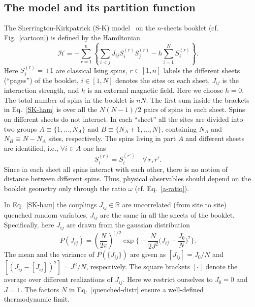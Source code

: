 \documentclass[twocolumn,superscriptaddress,prb,10pt]{revtex4-1}
\begin{document}
\subsection{The model and its partition function}
\label{the-model-def}

The Sherrington-Kirkpatrick (S-K) model~\cite{sherrington-1978-prl,
sherrington-1978} on the $n$-sheets booklet (cf. Fig.~\ref{cartoon}) is 
defined by the Hamiltonian
%
\begin{equation}
{\mathcal H}=-\sum\limits_{r=1}^n\left\{\sum\limits_{i<j}J_{ij}S^{(r)}_i 
S^{(r)}_j-h\sum\limits_{i=1}^NS^{(r)}_i\right\}.
\label{SK-ham}
\end{equation}
%
Here $S_i^{(r)}=\pm 1$ are classical Ising spins, $r\in[1,n]$ labels the 
different sheets (``pages'') of the booklet, $i\in[1,N]$ denotes the sites on 
each sheet, $J_{ij}$ is the interaction strength, and $h$ is an external 
magnetic field. Here we choose $h=0$. The total number of spins in the booklet 
is $nN$. The first sum inside the brackets in Eq.~\eqref{SK-ham} is over all the 
$N(N-1)/2$ pairs of spins in each sheet. Spins on different sheets do not interact. 
In each ``sheet'' all the sites are divided into two groups $A\equiv\{1,\dots, N_A\}$ 
and $B\equiv\{N_A+1,\dots,N\}$, containing $N_A$ and $N_B\equiv N-N_A$ sites, 
respectively. The spins living in part $A$ and different sheets are identified, i.e., 
$\forall i\in A$ one has  
%
\begin{equation}
S_i^{(r)}=S_{i}^{(r')}\quad\forall\, r,r'. 
\label{book-constraint}
\end{equation}
%
Since in each sheet all spins interact with each other, there is no notion of distance 
between different spins. Thus, physical observables should depend on the booklet geometry 
only through the ratio $\omega$ (cf. Eq.~\eqref{a-ratio}). 

In Eq.~\eqref{SK-ham} the couplings $J_{ij}\in\mathbb{R}$ are uncorrelated (from site to site) 
quenched random variables. $J_{ij}$ are the same in all the sheets of the booklet. Specifically, 
here $J_{ij}$ are drawn from the gaussian distribution   
%
\begin{equation}
P(J_{ij})=
\left(\frac{N}{2\pi}\right)^{1/2}
\exp\Big\{-\frac{N}{2J^2}
\Big(J_{ij}-\frac{J_0}{N}\Big)^2\Big\}.
\label{quenched-distr}
\end{equation}
%
The mean and the variance of $P(\{J_{ij}\})$ are given as $[J_{ij}]=J_0/N$ 
and $[(J_{ij}-[J_{ij}])^2]=J^2/N$, respectively. The square brackets $[\cdot]$ denote 
the average over different realizations of $J_{ij}$.  Here we restrict ourselves to 
$J_0=0$ and $J=1$. The factors $N$ in Eq.~\eqref{quenched-distr} ensure a well-defined 
thermodynamic limit. 
\end{document}
